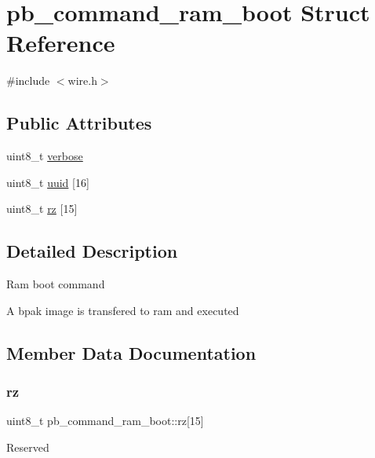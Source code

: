 \hypertarget{structpb__command__ram__boot}{}\section{pb\+\_\+command\+\_\+ram\+\_\+boot Struct Reference}
\label{structpb__command__ram__boot}


{\ttfamily \#include $<$wire.\+h$>$}

\subsection*{Public Attributes}
\begin{DoxyCompactItemize}
\item 
uint8\+\_\+t \hyperlink{structpb__command__ram__boot_aca6546127ee7aedc307ceaa43e5889d1}{verbose}
\item 
uint8\+\_\+t \hyperlink{structpb__command__ram__boot_a291f18dcf94b09ce46be0409353aa22f}{uuid} \mbox{[}16\mbox{]}
\item 
uint8\+\_\+t \hyperlink{structpb__command__ram__boot_a2968fdc7715d7ce4297812605b789c4d}{rz} \mbox{[}15\mbox{]}
\end{DoxyCompactItemize}


\subsection{Detailed Description}
Ram boot command

A bpak image is transfered to ram and executed 

\subsection{Member Data Documentation}
\mbox{\label{structpb__command__ram__boot_a2968fdc7715d7ce4297812605b789c4d}} 
\subsubsection{\texorpdfstring{rz}{rz}}
{\footnotesize\ttfamily uint8\+\_\+t pb\+\_\+command\+\_\+ram\+\_\+boot\+::rz\mbox{[}15\mbox{]}}

Reserved \mbox{\label{structpb__command__ram__boot_a291f18dcf94b09ce46be0409353aa22f}} 
